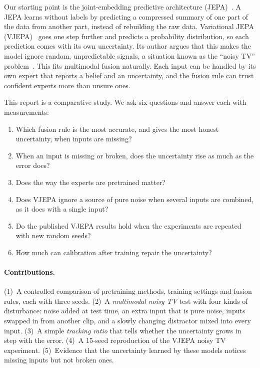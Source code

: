 \documentclass[10pt,twocolumn]{article}
\begin{document}
Our starting point is the joint-embedding predictive architecture (JEPA)~\cite{lecun2022path,assran2023ijepa}. A JEPA
learns without labels by predicting a compressed summary of one part of the data from another part, instead of
rebuilding the raw data. Variational JEPA (VJEPA)~\cite{huang2026vjepa} goes one step further and predicts a probability
distribution, so each prediction comes with its own uncertainty. Its author argues that this makes the model ignore
random, unpredictable signals, a situation known as the ``noisy TV'' problem~\cite{burda2019curiosity}. This fits
multimodal fusion naturally. Each input can be handled by its own expert that reports a belief and an uncertainty, and
the fusion rule can trust confident experts more than unsure ones.

This report is a comparative study. We ask six questions and answer each with measurements:
\begin{enumerate}
  \item Which fusion rule is the most accurate, and gives the most honest uncertainty, when inputs are missing?
  \item When an input is missing or broken, does the uncertainty rise as much as the error does?
  \item Does the way the experts are pretrained matter?
  \item Does VJEPA ignore a source of pure noise when several inputs are combined, as it does with a single input?
  \item Do the published VJEPA results hold when the experiments are repeated with new random seeds?
  \item How much can calibration after training repair the uncertainty?
\end{enumerate}

\paragraph{Contributions.}
(1)~A controlled comparison of pretraining methods, training settings and fusion rules, each with three seeds.
(2)~A \emph{multimodal noisy TV} test with four kinds of disturbance: noise added at test time, an extra input that is
pure noise, inputs swapped in from another clip, and a slowly changing distractor mixed into every input.
(3)~A simple \emph{tracking ratio} that tells whether the uncertainty grows in step with the error.
(4)~A 15-seed reproduction of the VJEPA noisy TV experiment.
(5)~Evidence that the uncertainty learned by these models notices missing inputs but not broken ones.
\end{document}
